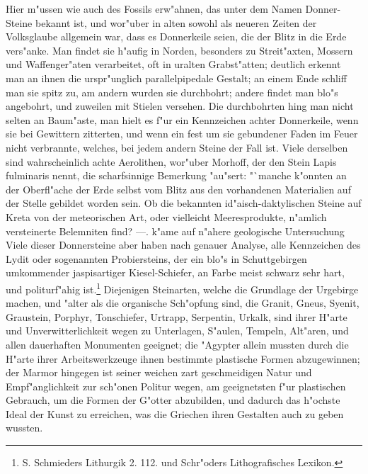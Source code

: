 \documentclass[a4paper, 11pt, oneside, polutonikogreek, german]{article}
\begin{document}
Hier m"ussen wie auch des Fossils erw"ahnen, das unter dem Namen Donner-Steine bekannt ist, und wor"uber in alten sowohl als neueren Zeiten der Volksglaube allgemein war, dass es Donnerkeile seien, die der Blitz in die Erde vers"anke. Man findet sie h"aufig in Norden, besonders zu Streit"axten, Mossern und Waffenger"aten verarbeitet, oft in uralten Grabst"atten; deutlich erkennt man an ihnen die urspr"unglich parallelpipedale Gestalt; an einem Ende schliff man sie spitz zu, am andern wurden sie durchbohrt; andere findet man blo"s angebohrt, und zuweilen mit Stielen versehen. Die durchbohrten hing man nicht selten an Baum"aste, man hielt es f"ur ein Kennzeichen achter Donnerkeile, wenn sie bei Gewittern zitterten, und wenn ein fest um sie gebundener Faden im Feuer nicht verbrannte, welches, bei jedem andern Steine der Fall ist. Viele derselben sind wahrscheinlich achte Aerolithen, wor"uber Morhoff, der den Stein Lapis fulminaris nennt, die scharfsinnige Bemerkung "au"sert: "`manche k"onnten an der Oberfl"ache der Erde selbst vom Blitz aus den vorhandenen Materialien auf der Stelle gebildet worden sein. Ob die bekannten id"aisch-daktylischen Steine auf Kreta von der meteorischen Art, oder vielleicht Meeresprodukte, n"amlich versteinerte Belemniten find? ---. k"ame auf n"ahere geologische Untersuchung Viele dieser Donnersteine aber haben nach genauer Analyse, alle Kennzeichen des Lydit oder sogenannten Probiersteins, der ein blo"s in Schuttgebirgen umkommender jaspisartiger Kiesel-Schiefer, an Farbe meist schwarz sehr hart, und politurf"ahig ist.\footnote{S. Schmieders Lithurgik 2. 112. und Schr"oders Lithografisches Lexikon.} Diejenigen Steinarten, welche die Grundlage der Urgebirge machen, und "alter als die organische Sch"opfung sind, die Granit, Gneus, Syenit, Graustein, Porphyr, Tonschiefer, Urtrapp, Serpentin, Urkalk, sind ihrer H"arte und Unverwitterlichkeit wegen zu Unterlagen, S"aulen, Tempeln, Alt"aren, und allen dauerhaften Monumenten geeignet; die "Agypter allein mussten durch die H"arte ihrer Arbeitswerkzeuge ihnen bestimmte plastische Formen abzugewinnen; der Marmor hingegen ist seiner weichen zart geschmeidigen Natur und Empf"anglichkeit zur sch"onen Politur wegen, am geeignetsten f"ur plastischen Gebrauch, um die Formen der G"otter abzubilden, und dadurch das h"ochste Ideal der Kunst zu erreichen, was die Griechen ihren Gestalten auch zu geben wussten.
\end{document}
